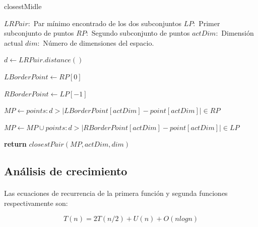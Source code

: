 \documentclass{article}
\newcommand\abs[1]{\left|#1\right|}
\begin{document}
		
		\begin{algorithm}[H]

			\caption{closestMidle}

			\label{closestMidle}

			\begin{algorithmic}[1] %

				\State $LRPair:$ Par mínimo encontrado de los dos subconjuntos
				\State $LP:$ Primer subconjunto de puntos
				\State $RP:$ Segundo subconjunto de puntos
				\State $actDim:$ Dimensión actual
				\State $dim:$ Número de dimensiones del espacio.
				\State

			
				\State $d \gets LRPair.distance()$

				\State $LBorderPoint \gets RP[0]$

				\State $RBorderPoint \gets LP[-1]$

				\State
				
				\State $MP \gets points: d > \abs{LBorderPoint[actDim] - point[actDim]} \in RP$

				\State $MP \gets MP \cup points:  d > \abs{RBorderPoint[actDim] - point[actDim]} \in LP$

				\State	
								
				\State \textbf{return} $closestPair(MP, actDim, dim)$


			\EndProcedure

			\end{algorithmic}

		\end{algorithm}

	\subsection{Análisis de crecimiento}
	
		\paragraph{}
		Las ecuaciones de recurrencia de la primera función y segunda funciones respectivamente son:
	
		\begin{equation}
		T(n) =  2T(n/2) + U(n) + O(nlogn)
		\end{equation}
		
\end{document}
